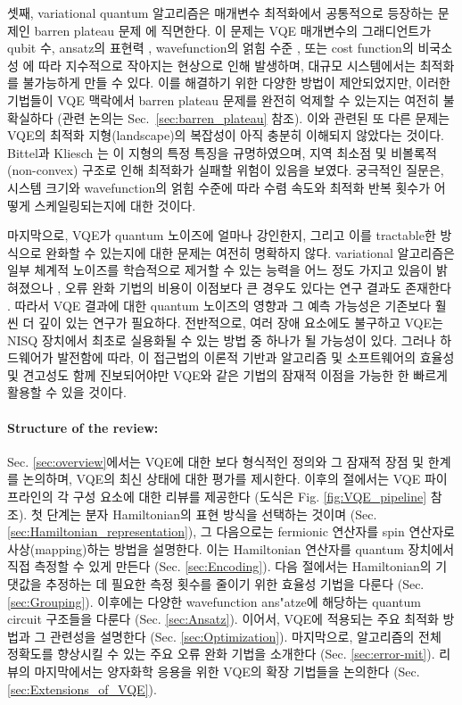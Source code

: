 셋째, variational quantum 알고리즘은 매개변수 최적화에서 공통적으로 등장하는 문제인 barren plateau 문제 \cite{Wecker2015, McClean2018, Cerezo2021_BP}에 직면한다. 이 문제는 VQE 매개변수의 그래디언트가 qubit 수, ansatz의 표현력 \cite{Holmes2016}, wavefunction의 얽힘 수준 \cite{OrtizMarrero2020, Patti2021}, 또는 cost function의 비국소성 \cite{Cerezo2021_BP, Uvarov2020, Sharma2020}에 따라 지수적으로 작아지는 현상으로 인해 발생하며, 대규모 시스템에서는 최적화를 불가능하게 만들 수 있다. 이를 해결하기 위한 다양한 방법이 제안되었지만, 이러한 기법들이 VQE 맥락에서 barren plateau 문제를 완전히 억제할 수 있는지는 여전히 불확실하다 (관련 논의는 Sec.~\ref{sec:barren_plateau} 참조). 이와 관련된 또 다른 문제는 VQE의 최적화 지형(landscape)의 복잡성이 아직 충분히 이해되지 않았다는 것이다. Bittel과 Kliesch \cite{Bittel2021}는 이 지형의 특정 특징을 규명하였으며, 지역 최소점 및 비볼록적(non-convex) 구조로 인해 최적화가 실패할 위험이 있음을 보였다. 궁극적인 질문은, 시스템 크기와 wavefunction의 얽힘 수준에 따라 수렴 속도와 최적화 반복 횟수가 어떻게 스케일링되는지에 대한 것이다.

마지막으로, VQE가 quantum 노이즈에 얼마나 강인한지, 그리고 이를 tractable한 방식으로 완화할 수 있는지에 대한 문제는 여전히 명확하지 않다. variational 알고리즘은 일부 체계적 노이즈를 학습적으로 제거할 수 있는 능력을 어느 정도 가지고 있음이 밝혀졌으나 \cite{Enrico2021EvaluatingNoiseResilience, Enrico2020NoiseInducedBreakingOfSymmetries}, 오류 완화 기법의 비용이 이점보다 큰 경우도 있다는 연구 결과도 존재한다 \cite{RyujiFundamentalLimits2021}. 따라서 VQE 결과에 대한 quantum 노이즈의 영향과 그 예측 가능성은 기존보다 훨씬 더 깊이 있는 연구가 필요하다. 전반적으로, 여러 장애 요소에도 불구하고 VQE는 NISQ 장치에서 최초로 실용화될 수 있는 방법 중 하나가 될 가능성이 있다. 그러나 하드웨어가 발전함에 따라, 이 접근법의 이론적 기반과 알고리즘 및 소프트웨어의 효율성 및 견고성도 함께 진보되어야만 VQE와 같은 기법의 잠재적 이점을 가능한 한 빠르게 활용할 수 있을 것이다.

\paragraph{Structure of the review:} Sec. \ref{sec:overview}에서는 VQE에 대한 보다 형식적인 정의와 그 잠재적 장점 및 한계를 논의하며, VQE의 최신 상태에 대한 평가를 제시한다. 이후의 절에서는 VQE 파이프라인의 각 구성 요소에 대한 리뷰를 제공한다 (도식은 Fig. \ref{fig:VQE_pipeline} 참조). 첫 단계는 분자 Hamiltonian의 표현 방식을 선택하는 것이며 (Sec. \ref{sec:Hamiltonian_representation}), 그 다음으로는 fermionic 연산자를 spin 연산자로 사상(mapping)하는 방법을 설명한다. 이는 Hamiltonian 연산자를 quantum 장치에서 직접 측정할 수 있게 만든다 (Sec. \ref{sec:Encoding}). 다음 절에서는 Hamiltonian의 기댓값을 추정하는 데 필요한 측정 횟수를 줄이기 위한 효율성 기법을 다룬다 (Sec. \ref{sec:Grouping}). 이후에는 다양한 wavefunction ans"atze에 해당하는 quantum circuit 구조들을 다룬다 (Sec. \ref{sec:Ansatz}). 이어서, VQE에 적용되는 주요 최적화 방법과 그 관련성을 설명한다 (Sec. \ref{sec:Optimization}). 마지막으로, 알고리즘의 전체 정확도를 향상시킬 수 있는 주요 오류 완화 기법을 소개한다 (Sec. \ref{sec:error-mit}). 리뷰의 마지막에서는 양자화학 응용을 위한 VQE의 확장 기법들을 논의한다 (Sec. \ref{sec:Extensions_of_VQE}).

